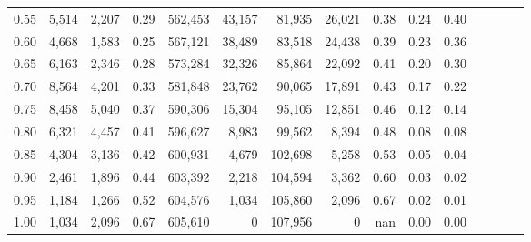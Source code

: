 \begin{tabular}{rrrcrrrrrrrrrrr}
0.55 &    5,514 &   2,207 &                                       0.29 &  562,453 &   43,157 &   81,935 &   26,021 &  0.38 &  0.24 &                         0.40 \\
0.60 &    4,668 &   1,583 &                                       0.25 &  567,121 &   38,489 &   83,518 &   24,438 &  0.39 &  0.23 &                         0.36 \\
0.65 &    6,163 &   2,346 &                                       0.28 &  573,284 &   32,326 &   85,864 &   22,092 &  0.41 &  0.20 &                         0.30 \\
0.70 &    8,564 &   4,201 &                                       0.33 &  581,848 &   23,762 &   90,065 &   17,891 &  0.43 &  0.17 &                         0.22 \\
0.75 &    8,458 &   5,040 &                                       0.37 &  590,306 &   15,304 &   95,105 &   12,851 &  0.46 &  0.12 &                         0.14 \\
0.80 &    6,321 &   4,457 &                                       0.41 &  596,627 &    8,983 &   99,562 &    8,394 &  0.48 &  0.08 &                         0.08 \\
0.85 &    4,304 &   3,136 &                                       0.42 &  600,931 &    4,679 &  102,698 &    5,258 &  0.53 &  0.05 &                         0.04 \\
0.90 &    2,461 &   1,896 &                                       0.44 &  603,392 &    2,218 &  104,594 &    3,362 &  0.60 &  0.03 &                         0.02 \\
0.95 &    1,184 &   1,266 &                                       0.52 &  604,576 &    1,034 &  105,860 &    2,096 &  0.67 &  0.02 &                         0.01 \\
1.00 &    1,034 &   2,096 &                                       0.67 &  605,610 &        0 &  107,956 &        0 &   nan &  0.00 &                         0.00 \\
\bottomrule
\end{tabular}
